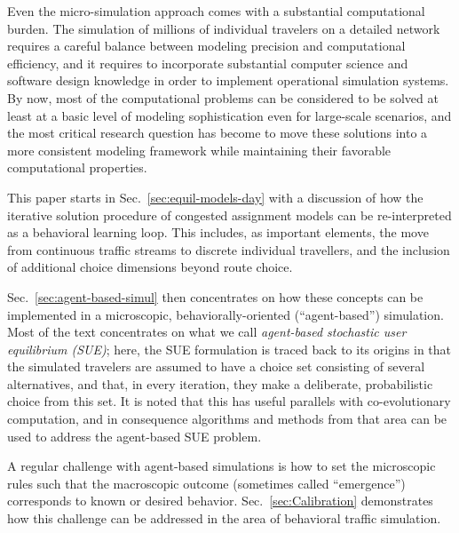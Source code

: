 
Even the micro-simulation approach comes with a substantial
computational burden. The simulation of millions of individual travelers
on a detailed network requires a careful balance between modeling precision
and computational efficiency, and it requires to incorporate substantial
computer science and software design knowledge in order to implement
operational simulation systems. By now, most of the computational problems 
can be considered to be solved at least at a basic level
of modeling sophistication even for large-scale scenarios, and the most
critical research question has become to move these solutions into
a more consistent modeling framework while maintaining their favorable
computational properties.


This paper starts in Sec.~\ref{sec:equil-models-day} with a discussion
of how the iterative solution procedure of congested assignment models
can be re-interpreted as a behavioral learning loop.  This includes,
as important elements, the move from continuous traffic streams to
discrete individual travellers, and the inclusion of additional choice
dimensions beyond route choice.  

Sec.~\ref{sec:agent-based-simul} then concentrates on how these
concepts can be implemented in a microscopic, behaviorally-oriented
(``agent-based'') simulation.  Most of the text concentrates on what
we call \emph{agent-based stochastic user equilibrium (SUE)};
here, the SUE formulation is traced
back to its origins in that the simulated travelers are assumed to
have a choice set consisting of several alternatives, and that, in
every iteration, they make a deliberate, probabilistic choice from
this set.  It is noted that this has useful parallels with
co-evolutionary computation, and in consequence algorithms and methods
from that area can be used to address the agent-based SUE problem.

A regular challenge with agent-based simulations is how to set the
microscopic rules such that the macroscopic outcome (sometimes called
``emergence'') corresponds to known or desired behavior.
Sec.~\ref{sec:Calibration} demonstrates how this challenge can be
addressed in the area of behavioral traffic simulation.

